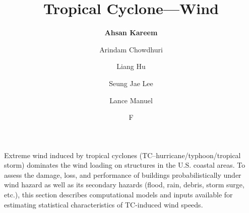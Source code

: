 %
%
%


%
%
%
%
%
%
%
%

\title{Tropical Cyclone---Wind}
\author{
    \textbf{Ahsan Kareem} 
    \and Arindam Chowdhuri
    \and Liang Hu
    \and Seung Jae Lee
    \and Lance Manuel
    \and F}
\tocauthor{}
%
%
\maketitle

Extreme wind induced by tropical cyclones (TC--hurricane/typhoon/tropical storm) dominates the wind loading on structures in the U.S. coastal areas. To assess the damage, loss, and performance of buildings probabilistically under wind hazard as well as its secondary hazards (flood, rain, debris, storm surge, etc.), this section describes computational models and inputs available for estimating statistical characteristics of TC-induced wind speeds. 

